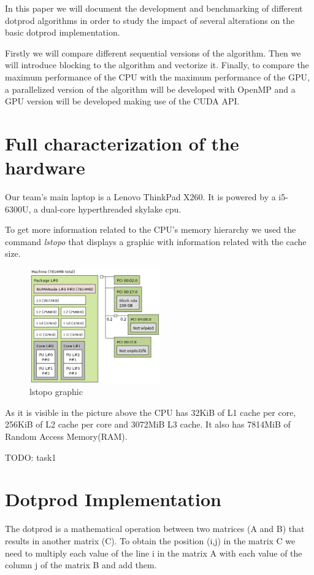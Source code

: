 \documentclass[a4paper]{report}
\begin{document}
In this paper we will document the development and benchmarking of different
dotprod algorithms in order to study the impact of several alterations on the
basic dotprod implementation.

Firstly we will compare different sequential versions of the algorithm. Then we
will introduce blocking to the algorithm and vectorize it. Finally, to compare
the maximum performance of the CPU with the maximum performance of the GPU, a
parallelized version of the algorithm will be developed with OpenMP and a GPU
version will be developed making use of the CUDA API.

\chapter{Full characterization of the hardware}
Our team's main laptop is a Lenovo ThinkPad X260. It is powered by a i5-6300U, a
dual-core hyperthreaded skylake cpu.

To get more information related to the CPU's memory hierarchy we used the
command \textit{lstopo} that displays a graphic with information related with
the cache size.
\begin{figure}[H]
    \centering
        \includegraphics[width=0.5\textwidth]{images/lstopo.png}
        \caption{lstopo graphic}
\end{figure}

As it is visible in the picture above the CPU has 32KiB of L1 cache per core,
256KiB of L2 cache per core and 3072MiB L3 cache. It also has 7814MiB of Random
Access Memory(RAM).

TODO: task1

\chapter{Dotprod Implementation}
The dotprod is a mathematical operation between two matrices (A and B) that
results in another matrix (C). To obtain the position (i,j) in the matrix C we
need to multiply each value of the line i in the matrix A with each value of the
column j of the matrix B and add them.
\end{document}
